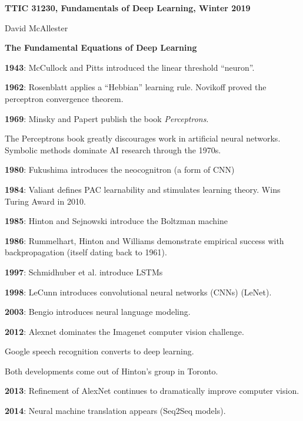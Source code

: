 




{\huge
  \centerline{\bf TTIC 31230,  Fundamentals of Deep Learning, Winter 2019}
  \vfill
  \centerline{David McAllester}
  \vfill
  \centerline{\bf The Fundamental Equations of Deep Learning}



{\bf 1943}: McCullock and Pitts introduced the linear threshold ``neuron''.

\vfill
{\bf 1962}: Rosenblatt applies a ``Hebbian'' learning rule.  Novikoff proved the perceptron convergence theorem.

\vfill
{\bf 1969}: Minsky and Papert publish the book {\it Perceptrons}.

\vfill
The Perceptrons book greatly discourages work in artificial neural networks.  Symbolic methods dominate AI research through the 1970s.


{\bf 1980}: Fukushima introduces the neocognitron (a form of CNN)

\vfill
{\bf 1984}: Valiant defines PAC learnability and stimulates learning theory. Wins Turing Award in 2010.

\vfill
{\bf 1985}: Hinton and Sejnowski introduce the Boltzman machine

\vfill
{\bf 1986}: Rummelhart, Hinton and Williams demonstrate empirical success with backpropagation (itself dating back to 1961).


{\bf 1997}: Schmidhuber et al. introduce LSTMs

\vfill
{\bf 1998}: LeCunn introduces convolutional neural networks (CNNs) (LeNet).

\vfill
{\bf 2003}: Bengio introduces neural language modeling.


{\bf 2012}: Alexnet dominates the Imagenet computer vision challenge.

\vfill
Google speech recognition converts to deep learning.

\vfill
Both developments come out of Hinton's group in Toronto.

\vfill
{\bf 2013}: Refinement of AlexNet continues to dramatically improve computer vision.

\vfill
{\bf 2014}: Neural machine translation appears (Seq2Seq models).

}

